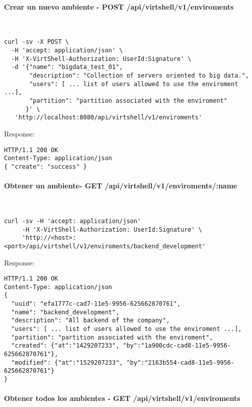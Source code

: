 \paragraph{Crear un nuevo ambiente - POST /api/virtshell/v1/enviroments} ~\\

\begin{lstlisting}[style=json]
curl -sv -X POST \
  -H 'accept: application/json' \
  -H 'X-VirtShell-Authorization: UserId:Signature' \
  -d '{"name": "bigdata_test_01",
       "description": "Collection of servers oriented to big data.", 
       "users": [ ... list of users allowed to use the enviroment ...],
       "partition": "partition associated with the enviroment"
      }' \
   'http://localhost:8080/api/virtshell/v1/enviroments'
\end{lstlisting}

Response:

\begin{lstlisting}[style=json]
HTTP/1.1 200 OK
Content-Type: application/json
{ "create": "success" }
\end{lstlisting}

\paragraph{Obtener un ambiente- GET /api/virtshell/v1/enviroments/:name} ~\\

\begin{lstlisting}[style=json]
curl -sv -H 'accept: application/json' 
     -H 'X-VirtShell-Authorization: UserId:Signature' \ 
     'http://<host>:<port>/api/virtshell/v1/enviroments/backend_development'
\end{lstlisting}

Response:

\begin{lstlisting}[style=json]
HTTP/1.1 200 OK
Content-Type: application/json
{
  "uuid": "efa1777c-cad7-11e5-9956-625662870761",
  "name": "backend_development",
  "description": "All backend of the company", 
  "users": [ ... list of users allowed to use the enviroment ...],
  "partition": "partition associated with the enviroment",
  "created": {"at":"1429207233", "by":"1a900cdc-cad8-11e5-9956-625662870761"},
  "modified": {"at":"1529207233", "by":"2163b554-cad8-11e5-9956-625662870761"}
}
\end{lstlisting}

\paragraph{Obtener todos los ambientes - GET /api/virtshell/v1/enviroments} ~\\

